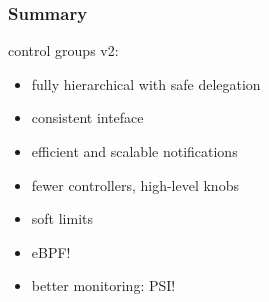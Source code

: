 \documentclass[serif]{beamer}
\begin{document}
\begin{frame}
  \frametitle{Summary}

  control groups v2:
  \begin{itemize}
  \item fully hierarchical with safe delegation
  \item consistent inteface
  \item efficient and scalable notifications
  \item fewer controllers, high-level knobs
  \item soft limits
  \item eBPF!
  \item better monitoring: PSI!
  \end{itemize}
\end{frame}
\end{document}
